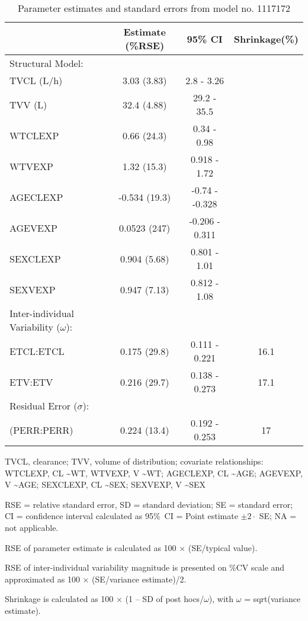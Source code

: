 \begin{table}[ht]
\begin{threeparttable}
\centering
\caption{Parameter estimates and standard errors from model no. 1117172} 
\label{tab:paramsum1117172}
\begingroup\small
\begin{tabular}{lccc}
  \hline
 & Estimate (\%RSE) & 95\% CI & Shrinkage(\%) \\ 
  \hline
Structural Model: &  &  &  \\ 
  TVCL (L/h)& 3.03 (3.83) & 2.8 - 3.26 &  \\ 
  TVV (L)& 32.4 (4.88) & 29.2 - 35.5 &  \\ 
  WTCLEXP & 0.66 (24.3) & 0.34 - 0.98 &  \\ 
  WTVEXP & 1.32 (15.3) & 0.918 - 1.72 &  \\ 
  AGECLEXP & -0.534 (19.3) & -0.74 - -0.328 &  \\ 
  AGEVEXP & 0.0523 (247) & -0.206 - 0.311 &  \\ 
  SEXCLEXP & 0.904 (5.68) & 0.801 - 1.01 &  \\ 
  SEXVEXP & 0.947 (7.13) & 0.812 - 1.08 &  \\ 
  Inter-individual Variability ($\omega$): &  &  &  \\ 
  ETCL:ETCL & 0.175 (29.8) & 0.111 - 0.221 & 16.1 \\ 
  ETV:ETV & 0.216 (29.7) & 0.138 - 0.273 & 17.1 \\ 
  Residual Error ($\sigma$): &  &  &  \\ 
   (PERR:PERR) & 0.224 (13.4) & 0.192 - 0.253 & 17 \\ 
   \hline
\end{tabular}
\endgroup
\begin{tablenotes}\footnotesize
\item[] TVCL, clearance; TVV, volume of distribution; covariate relationships: WTCLEXP, CL \textasciitilde WT, WTVEXP, V \textasciitilde WT; AGECLEXP, CL \textasciitilde AGE; AGEVEXP, V \textasciitilde AGE; SEXCLEXP, CL \textasciitilde SEX; SEXVEXP, V \textasciitilde SEX
\item[] RSE = relative standard error, SD = standard deviation; SE = standard error; CI = confidence interval calculated as 95\%~CI = Point estimate $\pm 2 \cdot$ SE; NA = not applicable.
\item[] RSE of parameter estimate is calculated as 100 × (SE/typical value).
\item[] RSE of inter-individual variability magnitude is presented on \%CV scale and approximated as 100 × (SE/variance estimate)/2.
\item[] Shrinkage is calculated as 100 × (1 – SD of post hocs/$\omega$), with $\omega$ = sqrt(variance estimate).
\end{tablenotes}
\end{threeparttable}
\end{table}
